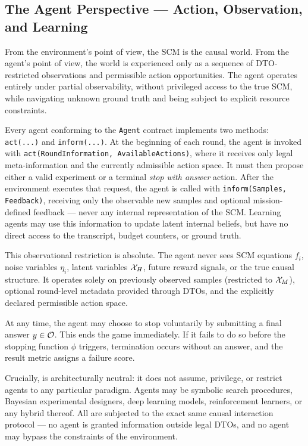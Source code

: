 \subsection{The Agent Perspective — Action, Observation, and Learning}
From the environment’s point of view, the SCM is the causal world. From the agent’s point of view, the world is experienced only as a sequence of DTO-restricted observations and permissible action opportunities. The agent operates entirely under partial observability, without privileged access to the true SCM, while navigating unknown ground truth and being subject to explicit resource constraints.

Every agent conforming to the \texttt{Agent} contract implements two methods: \texttt{act(...)} and \texttt{inform(...)}. At the beginning of each round, the agent is invoked with \texttt{act(RoundInformation, AvailableActions)}, where it receives only legal meta-information and the currently admissible action space. It must then propose either a valid experiment or a terminal \emph{stop with answer} action. After the environment executes that request, the agent is called with \texttt{inform(Samples, Feedback)}, receiving only the observable new samples and optional mission-defined feedback — never any internal representation of the SCM. Learning agents may use this information to update latent internal beliefs, but have no direct access to the transcript, budget counters, or ground truth.

This observational restriction is absolute. The agent never sees SCM equations $f_i$, noise variables $\eta_i$, latent variables $\mathcal{X}_H$, future reward signals, or the true causal structure. It operates solely on previously observed samples (restricted to $\mathcal{X}_M$), optional round-level metadata provided through DTOs, and the explicitly declared permissible action space.

At any time, the agent may choose to stop voluntarily by submitting a final answer $y \in \outputspace$. This ends the game immediately. If it fails to do so before the stopping function $\phi$ triggers, termination occurs without an answer, and the result metric assigns a failure score.

Crucially, \game is architecturally neutral: it does not assume, privilege, or restrict agents to any particular paradigm. Agents may be symbolic search procedures, Bayesian experimental designers, deep learning models, reinforcement learners, or any hybrid thereof. All are subjected to the exact same causal interaction protocol — no agent is granted information outside legal DTOs, and no agent may bypass the constraints of the environment.

